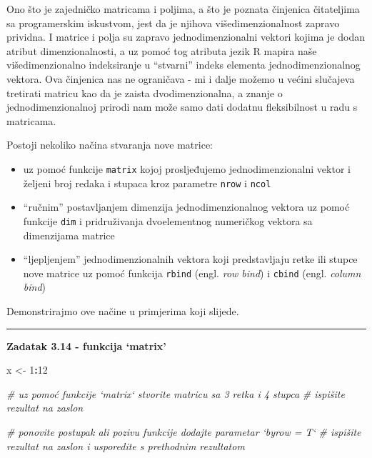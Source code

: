 \documentclass[]{book}
\newenvironment{Shaded}{\begin{snugshade}}{\end{snugshade}}
\newcommand{\DecValTok}[1]{\textcolor[rgb]{0.00,0.00,0.81}{#1}}
\newcommand{\StringTok}[1]{\textcolor[rgb]{0.31,0.60,0.02}{#1}}
\newcommand{\CommentTok}[1]{\textcolor[rgb]{0.56,0.35,0.01}{\textit{#1}}}
\newcommand{\OperatorTok}[1]{\textcolor[rgb]{0.81,0.36,0.00}{\textbf{#1}}}
\newcommand{\NormalTok}[1]{#1}
\providecommand{\tightlist}{%
  \setlength{\itemsep}{0pt}\setlength{\parskip}{0pt}}
\theoremstyle{definition}
\theoremstyle{definition}
\theoremstyle{definition}
\theoremstyle{remark}
\begin{document}
Ono što je zajedničko matricama i poljima, a što je poznata činjenica
čitateljima sa programerskim iskustvom, jest da je njihova
višedimenzionalnost zapravo prividna. I matrice i polja su zapravo
jednodimenzionalni vektori kojima je dodan atribut dimenzionalnosti, a
uz pomoć tog atributa jezik R mapira naše višedimenzionalno indeksiranje
u ``stvarni'' indeks elementa jednodimenzionalnog vektora. Ova činjenica
nas ne ograničava - mi i dalje možemo u većini slučajeva tretirati
matricu kao da je zaista dvodimenzionalna, a znanje o
jednodimenzionalnoj prirodi nam može samo dati dodatnu fleksibilnost u
radu s matricama.

Postoji nekoliko načina stvaranja nove matrice:

\begin{itemize}
\tightlist
\item
  uz pomoć funkcije \texttt{matrix} kojoj prosljeđujemo
  jednodimenzionalni vektor i željeni broj redaka i stupaca kroz
  parametre \texttt{nrow} i \texttt{ncol}
\item
  ``ručnim'' postavljanjem dimenzija jednodimenzionalnog vektora uz
  pomoć funkcije \texttt{dim} i pridruživanja dvoelementnog numeričkog
  vektora sa dimenzijama matrice
\item
  ``ljepljenjem'' jednodimenzionalnih vektora koji predstavljaju retke
  ili stupce nove matrice uz pomoć funkcija \texttt{rbind} (engl.
  \emph{row bind}) i \texttt{cbind} (engl. \emph{column bind})
\end{itemize}

Demonstrirajmo ove načine u primjerima koji slijede.

\begin{center}\rule{0.5\linewidth}{\linethickness}\end{center}

\textbf{Zadatak 3.14 - funkcija `matrix'}

\begin{Shaded}
\begin{Highlighting}[]
\NormalTok{x <-}\StringTok{ }\DecValTok{1}\OperatorTok{:}\DecValTok{12}

\CommentTok{# uz pomoć funkcije `matrix` stvorite matricu sa 3 retka i 4 stupca}
\CommentTok{# ispišite rezultat na zaslon}

\CommentTok{# ponovite postupak ali pozivu funkcije dodajte parametar `byrow = T`}
\CommentTok{# ispišite rezultat na zaslon i usporedite s prethodnim rezultatom}
\end{Highlighting}
\end{Shaded}
\end{document}
